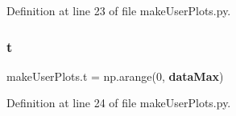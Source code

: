 Definition at line 23 of file make\+User\+Plots.\+py.

\mbox{\label{namespacemake_user_plots_a401c8c7662c954ec76e36c99e9863510}} 
\subsubsection{t}
{\footnotesize\ttfamily make\+User\+Plots.\+t = np.\+arange(0,\textbf{ data\+Max})}



Definition at line 24 of file make\+User\+Plots.\+py.

